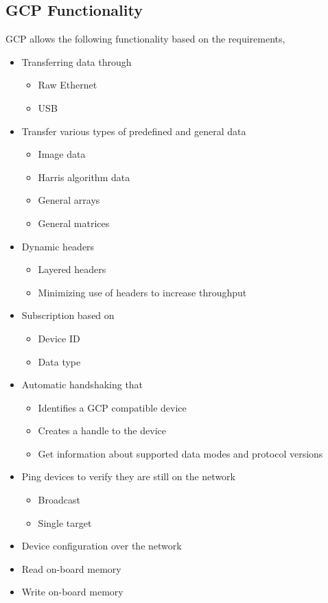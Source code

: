 \subsection{GCP Functionality}
GCP allows the following functionality based on the requirements,
\begin{itemize}
\item Transferring data through
	\begin{itemize}
	\item Raw Ethernet
	\item USB
	\end{itemize}
\item Transfer various types of predefined and general data
	\begin{itemize}
	\item Image data
	\item Harris algorithm data
	\item General arrays
	\item General matrices
	\end{itemize}
\item Dynamic headers
	\begin{itemize}
	\item Layered headers
	\item Minimizing use of headers to increase throughput
	\end{itemize}
\item Subscription based on
	\begin{itemize}
	\item Device ID
	\item Data type
	\end{itemize}
\item Automatic handshaking that
	\begin{itemize}
	\item Identifies a GCP compatible device
	\item Creates a handle to the device
	\item Get information about supported data modes and protocol versions
	\end{itemize}
\item Ping devices to verify they are still on the network
	\begin{itemize}
	\item Broadcast
	\item Single target
	\end{itemize}
\item Device configuration over the network
\item Read on-board memory
\item Write on-board memory
\end{itemize}

